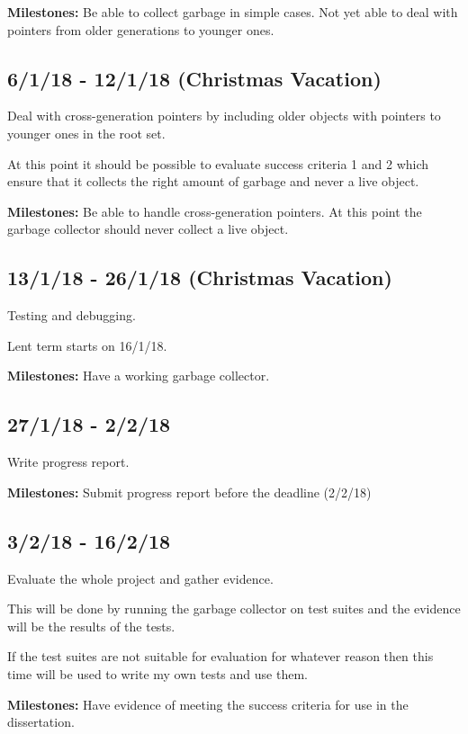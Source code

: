 \documentclass[12pt, a4]{article}
\begin{document}
{\bf Milestones:} Be able to collect garbage in simple cases. Not yet able to deal with pointers from older generations to younger ones.

\subsection*{6/1/18 - 12/1/18 (Christmas Vacation)}

Deal with cross-generation pointers by including older objects with pointers to younger ones in the root set.

At this point it should be possible to evaluate success criteria 1 and 2 which ensure that it collects the right amount of garbage and never a live object.

{\bf Milestones:} Be able to handle cross-generation pointers. At this point the garbage collector should never collect a live object.

\subsection*{13/1/18 - 26/1/18 (Christmas Vacation)}

Testing and debugging.

Lent term starts on 16/1/18.

{\bf Milestones:} Have a working garbage collector.

\subsection*{27/1/18 - 2/2/18}

Write progress report.

{\bf Milestones:} Submit progress report before the deadline (2/2/18)

\subsection*{3/2/18 - 16/2/18}

Evaluate the whole project and gather evidence.

This will be done by running the garbage collector on test suites and the evidence will be the results of the tests.

If the test suites are not suitable for evaluation for whatever reason then this time will be used to write my own tests and use them.

{\bf Milestones:} Have evidence of meeting the success criteria for use in the dissertation.
\end{document}
